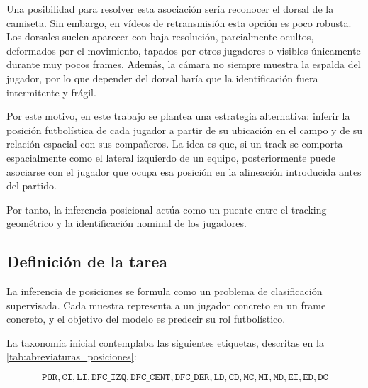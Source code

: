 Una posibilidad para resolver esta asociación sería reconocer el dorsal de la camiseta. Sin embargo, en vídeos de retransmisión esta opción es poco robusta. Los dorsales suelen aparecer con baja resolución, parcialmente ocultos, deformados por el movimiento, tapados por otros jugadores o visibles únicamente durante muy pocos frames. Además, la cámara no siempre muestra la espalda del jugador, por lo que depender del dorsal haría que la identificación fuera intermitente y frágil.

Por este motivo, en este trabajo se plantea una estrategia alternativa: inferir la posición futbolística de cada jugador a partir de su ubicación en el campo y de su relación espacial con sus compañeros. La idea es que, si un track se comporta espacialmente como el lateral izquierdo de un equipo, posteriormente puede asociarse con el jugador que ocupa esa posición en la alineación introducida antes del partido.

Por tanto, la inferencia posicional actúa como un puente entre el tracking geométrico y la identificación nominal de los jugadores.

\subsection{Definición de la tarea}
\label{subsec:definicion-tarea-inferencia-posicional}

La inferencia de posiciones se formula como un problema de clasificación supervisada. Cada muestra representa a un jugador concreto en un frame concreto, y el objetivo del modelo es predecir su rol futbolístico.

La taxonomía inicial contemplaba las siguientes etiquetas, descritas en la \hyperref[tab:abreviaturas_posiciones]{\ref*{tab:abreviaturas_posiciones}}:

\[
\texttt{POR}, \texttt{CI}, \texttt{LI}, \texttt{DFC\_IZQ}, \texttt{DFC\_CENT}, \texttt{DFC\_DER}, \texttt{LD}, \texttt{CD}, \texttt{MC}, \texttt{MI}, \texttt{MD}, \texttt{EI}, \texttt{ED}, \texttt{DC}
\]

